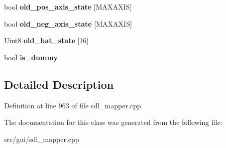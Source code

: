 \begin{DoxyCompactItemize}
\item 
\hypertarget{classCStickBindGroup_a283b8cbb49f54ad309ac461d31fcb8f3}{bool {\bfseries old\-\_\-pos\-\_\-axis\-\_\-state} \mbox{[}M\-A\-X\-A\-X\-I\-S\mbox{]}}\label{classCStickBindGroup_a283b8cbb49f54ad309ac461d31fcb8f3}

\item 
\hypertarget{classCStickBindGroup_abf4f7de4055e1e6a70016a6830a39128}{bool {\bfseries old\-\_\-neg\-\_\-axis\-\_\-state} \mbox{[}M\-A\-X\-A\-X\-I\-S\mbox{]}}\label{classCStickBindGroup_abf4f7de4055e1e6a70016a6830a39128}

\item 
\hypertarget{classCStickBindGroup_a19df3fcb72315b312752da5a66676dc3}{Uint8 {\bfseries old\-\_\-hat\-\_\-state} \mbox{[}16\mbox{]}}\label{classCStickBindGroup_a19df3fcb72315b312752da5a66676dc3}

\item 
\hypertarget{classCStickBindGroup_a23c7e557c5ce9b73c62321e8c1504abc}{bool {\bfseries is\-\_\-dummy}}\label{classCStickBindGroup_a23c7e557c5ce9b73c62321e8c1504abc}

\end{DoxyCompactItemize}


\subsection{Detailed Description}


Definition at line 963 of file sdl\-\_\-mapper.\-cpp.



The documentation for this class was generated from the following file\-:\begin{DoxyCompactItemize}
\item 
src/gui/sdl\-\_\-mapper.\-cpp\end{DoxyCompactItemize}
